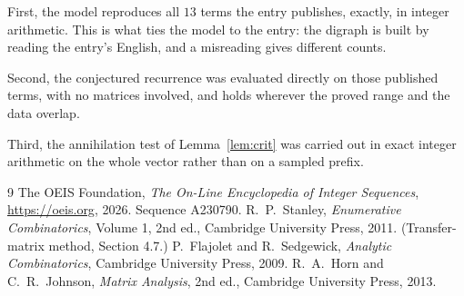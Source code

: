 \documentclass[11pt,a4paper]{article}
\theoremstyle{plain}
\theoremstyle{definition}
\begin{document}
First, the model reproduces all $13$ terms the entry publishes, exactly, in integer
arithmetic. This is what ties the model to the entry: the digraph is built by reading the
entry's English, and a misreading gives different counts.

Second, the conjectured recurrence was evaluated directly on those published terms, with no
matrices involved, and holds wherever the proved range and the data overlap.

Third, the annihilation test of Lemma~\ref{lem:crit} was carried out in exact integer
arithmetic on the whole vector rather than on a sampled prefix.

\begin{thebibliography}{9}
 The OEIS Foundation, \emph{The On-Line Encyclopedia of Integer
Sequences}, \url{https://oeis.org}, 2026. Sequence A230790.
 R.~P.~Stanley, \emph{Enumerative Combinatorics}, Volume 1, 2nd ed.,
Cambridge University Press, 2011. (Transfer-matrix method, Section 4.7.)
 P.~Flajolet and R.~Sedgewick, \emph{Analytic Combinatorics}, Cambridge
University Press, 2009.
 R.~A.~Horn and C.~R.~Johnson, \emph{Matrix Analysis}, 2nd ed., Cambridge
University Press, 2013.
\end{thebibliography}
\end{document}
